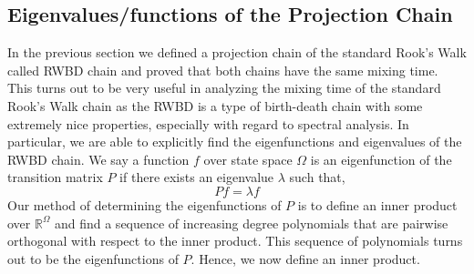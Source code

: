 \documentclass{article}
\theoremstyle{definition}
\theoremstyle{definition}
\theoremstyle{definition}
\theoremstyle{definition}
\theoremstyle{named}
\begin{document}
\subsection{Eigenvalues/functions of the Projection Chain}
In the previous section we defined a projection chain of the standard Rook's Walk called RWBD chain and proved that both chains have the same mixing time. This turns out to be very useful in analyzing the mixing time of the standard Rook's Walk chain as the RWBD is a type of birth-death chain with some extremely nice properties, especially with regard to spectral analysis. In particular, we are able to explicitly find the eigenfunctions and eigenvalues of the RWBD chain. We say a function $f$ over state space $\Omega$ is an eigenfunction of the transition matrix $P$ if there exists an eigenvalue $\lambda$ such that,
\[Pf = \lambda f\] 
Our method of determining the eigenfunctions of $P$ is to define an inner product over $\mathbb{R}^\Omega$ and find      a sequence of increasing degree polynomials that are pairwise orthogonal with respect to the inner product. This sequence of polynomials turns out to be the eigenfunctions of $P$. Hence, we now define an inner product.
\end{document}
